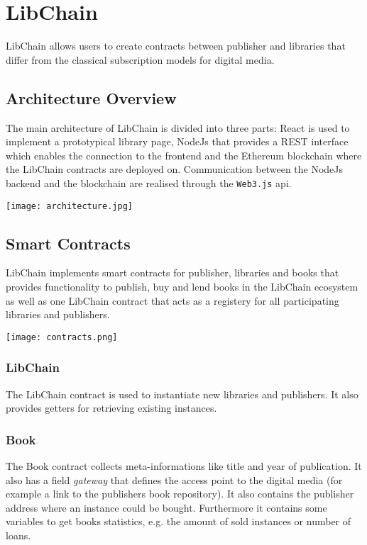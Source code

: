 \chapter{LibChain}
LibChain allows users to create contracts between publisher and libraries that differ from the classical subscription models for digital media. 

\section{Architecture Overview}
The main architecture of LibChain is divided into three parts: React is used to implement a prototypical library page, NodeJs that provides a REST interface which enables the connection to the frontend and the Ethereum blockchain where the LibChain contracts are deployed on. Communication between the NodeJs backend and the blockchain are realised through the \texttt{Web3.js} api.

\vspace{0.3cm}
\texttt{[image: architecture.jpg]}
\section{Smart Contracts}
LibChain implements smart contracts for publisher, libraries and books that provides functionality to publish, buy and lend books in the LibChain ecosystem as well as one LibChain contract that acts as a registery for all participating libraries and publishers.

\vspace{0.3cm}
\texttt{[image: contracts.png]}

\subsection{LibChain}
The LibChain contract is used to instantiate new libraries and publishers. It also provides getters for retrieving existing instances.

\subsection{Book}
The Book contract collects meta-informations like title and year of publication. It also has a field \textit{gateway} that defines the access point to the digital media (for example a link to the publishers book repository). It also contains the publisher address where an instance could be bought. Furthermore it contains some variables to get books statistics, e.g. the amount of sold instances or number of loans.


